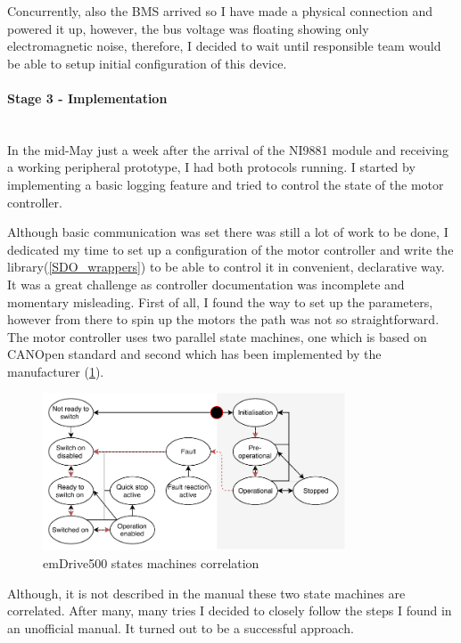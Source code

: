 Concurrently, also the BMS arrived so I have made a physical connection and powered it up, however, the bus voltage was floating showing only electromagnetic noise, therefore, I decided to wait until responsible team would be able to setup initial configuration of this device.

\paragraph{Stage 3 - Implementation}   
\addtocounter{section}{1}
\mbox{}\\
In the mid-May just a week after the arrival of the NI9881 module and receiving a working peripheral prototype, I had both protocols running. I started by implementing a basic logging feature and tried to control the state of the motor controller. 

Although basic communication was set there was still a lot of work to be done, I dedicated my time to set up a configuration of the motor controller and write the library(\ref{SDO_wrappers}) to be able to control it in convenient, declarative way.
It was a great challenge as controller documentation was incomplete and momentary misleading. First of all, I found the way to set up the parameters, however from there to spin up the motors the path was not so straightforward. 
The motor controller uses two parallel state machines, one which is based on CANOpen standard and second which has been implemented by the manufacturer (\ref{fig:em500_states}). 
\begin{figure}[H]
    \centering
    \includegraphics[width=0.8\textwidth]{figures/em500_state}
    \caption{emDrive500 states machines correlation}
    \label{fig:em500_states}
\end{figure}
Although, it is not described in the manual these two state machines are correlated. After many, many tries I decided to closely follow the steps I found in an unofficial manual. It turned out to be a successful approach. 

